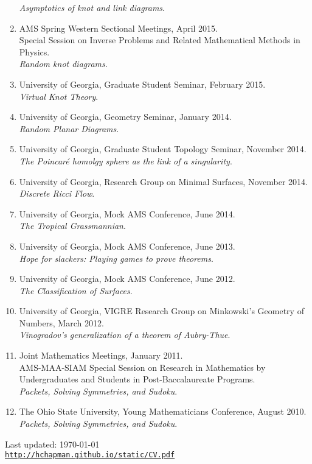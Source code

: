 \documentclass[letterpaper]{article}
\def\footerlink{http://hchapman.github.io/static/CV.pdf}
\begin{document}
\begin{enumerate}
  \textit{Asymptotics of knot and link diagrams}.
\item AMS Spring Western Sectional Meetings, April 2015.\\
  Special Session on Inverse Problems and Related Mathematical Methods in Physics. \\
  \textit{Random knot diagrams}.
\item University of Georgia, Graduate Student Seminar, February
  2015.\\
  \textit{Virtual Knot Theory}.
\item University of Georgia, Geometry Seminar, January 2014.\\
  \textit{Random Planar Diagrams}.
\item University of Georgia, Graduate Student Topology Seminar,
  November 2014.\\
  \textit{The Poincar\'e homolgy sphere as the link of a singularity}.
\item University of Georgia, Research Group on
  Minimal Surfaces, November 2014.\\
  \textit{Discrete Ricci Flow}.
\item University of Georgia, Mock AMS Conference, June 2014.\\
  \textit{The Tropical Grassmannian}.
\item University of Georgia, Mock AMS Conference, June 2013.\\
  \textit{Hope for slackers: Playing games to prove theorems}.
\item University of Georgia, Mock AMS Conference, June 2012.\\
  \textit{The Classification of Surfaces}.
\item University of Georgia, VIGRE Research Group on Minkowski's
  Geometry of Numbers, March 2012.\\
  \textit{Vinogradov's generalization of a theorem of Aubry-Thue}.
\item Joint Mathematics Meetings, January 2011.\\
  AMS-MAA-SIAM Special Session on Research in Mathematics by
  Undergraduates and Students in Post-Baccalaureate Programs.\\
  \textit{Packets, Solving Symmetries, and Sudoku}.
\item The Ohio State University, Young Mathematicians Conference,
  August 2010.\\
  \textit{Packets, Solving Symmetries, and Sudoku}.
\end{enumerate}

\bigskip

\begin{center}
  \begin{footnotesize}
    Last updated: \today \\
    \href{\footerlink}{\texttt{\footerlink}}
  \end{footnotesize}
\end{center}
\end{document}

